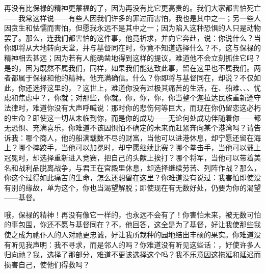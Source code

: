 再没有比保禄的精神更蒙福的了，因为再没有比它更高贵的。我们大家都害怕死亡——我常这样说——有些人因我们许多的罪过而害怕，我也是其中之一；另一些人因贪生和怯懦而害怕，但愿我永远不是其中之一；因为陷入这种恐惧的人只是动物罢了。那么，连我们都害怕的这件事，他竟祈求，并向它奔赴，说：你说什么？当你即将从大地转向天堂，并与基督同在时，你竟不知道选择什么？不，这与保禄的精神相去甚远；因为若有人能确凿地得到这样的提议，难道他不会立刻抓住它吗？是的，因为既然不属我们，同样，如果我们能达致此事，留在这里也不属我们。两者都属于保禄和他的精神。他充满确信。什么？你即将与基督同在，却说？不仅如此，你还选择这里的，？这世上，难道你没有过极其痛苦的生活，在、船难、、、忧虑和焦虑中？，你就；对那些，你就。你，你，你，你当整个迦拉达民族重新遵守法律时，难道你没有大声呼喊说：那时你的悲伤何等巨大，而现在你仍留恋这必朽的生命？即使这一切从未临到你，而是你的成功——无论何处成功伴随着你——都无恐惧、充满喜乐，你难道不该因惧怕不确定的未来而赶紧奔向某个港湾吗？请告诉我：哪个商人，他的船满载数不尽的财富，当他可以进港休息，却宁愿还留在海上？哪个摔跤手，当他可以加冕时，却宁愿继续比赛？哪个拳击手，当他可以戴上冠冕时，却选择重新进入竞赛，把自己的头献上挨打？哪个将军，当他可以带着美名和战利品脱离战争，与君王在宫殿里休息，却选择继续劳苦、列阵作战？那么，你这个过得如此痛苦的生命，怎么还想留在这里？你难道没有说过：我害怕即使没有别的缘故，单为这个，你也当渴望解脱；即使现在有无数好处，仍要为你的渴望——基督。\par

哦，保禄的精神！再没有像它一样的，也永远不会有了！你害怕未来，被无数可怕的事包围，你还不愿与基督同在？不，他回答，这全是为了基督，好让我使那些我使之成为祂仆人的人对祂更忠诚，好让我所栽种的园地结出丰硕的果实。你难道没有听见我声明：我不寻求，而是邻人的吗？你难道没有听见这些话：，好使许多人归向祂？我，选择了那部分，难道不更该选择这个吗？我不乐意因这拖延和延迟而损害自己，使他们得救吗？\par

